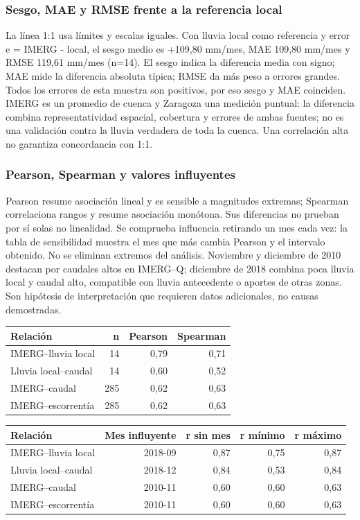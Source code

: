 \subsubsection*{Sesgo, MAE y RMSE frente a la referencia local}
La línea 1:1 usa límites y escalas iguales. Con lluvia local como referencia y error e = IMERG - local, el sesgo medio es +109,80 mm/mes, MAE 109,80 mm/mes y RMSE 119,61 mm/mes (n=14). El sesgo indica la diferencia media con signo; MAE mide la diferencia absoluta típica; RMSE da más peso a errores grandes. Todos los errores de esta muestra son positivos, por eso sesgo y MAE coinciden. IMERG es un promedio de cuenca y Zaragoza una medición puntual: la diferencia combina representatividad espacial, cobertura y errores de ambas fuentes; no es una validación contra la lluvia verdadera de toda la cuenca. Una correlación alta no garantiza concordancia con 1:1.
\subsubsection*{Pearson, Spearman y valores influyentes}
Pearson resume asociación lineal y es sensible a magnitudes extremas; Spearman correlaciona rangos y resume asociación monótona. Sus diferencias no prueban por sí solas no linealidad. Se comprueba influencia retirando un mes cada vez: la tabla de sensibilidad muestra el mes que más cambia Pearson y el intervalo obtenido. No se eliminan extremos del análisis. Noviembre y diciembre de 2010 destacan por caudales altos en IMERG--Q; diciembre de 2018 combina poca lluvia local y caudal alto, compatible con lluvia antecedente o aportes de otras zonas. Son hipótesis de interpretación que requieren datos adicionales, no causas demostradas.
\begin{center}\small\begin{tabular}{lrrr}\hline
Relación & n & Pearson & Spearman \\ \hline
IMERG--lluvia local & 14 & 0,79 & 0,71 \\
Lluvia local--caudal & 14 & 0,60 & 0,52 \\
IMERG--caudal & 285 & 0,62 & 0,63 \\
IMERG--escorrentía & 285 & 0,62 & 0,63 \\
\hline\end{tabular}\end{center}
\begin{center}\small\begin{tabular}{lrrrr}\hline
Relación & Mes influyente & r sin mes & r mínimo & r máximo \\ \hline
IMERG--lluvia local & 2018-09 & 0,87 & 0,75 & 0,87 \\
Lluvia local--caudal & 2018-12 & 0,84 & 0,53 & 0,84 \\
IMERG--caudal & 2010-11 & 0,60 & 0,60 & 0,63 \\
IMERG--escorrentía & 2010-11 & 0,60 & 0,60 & 0,63 \\
\hline\end{tabular}\end{center}
